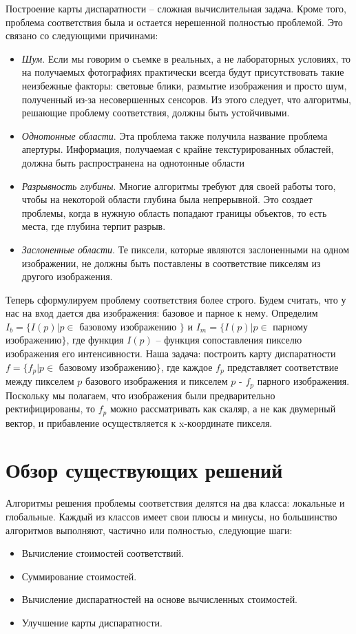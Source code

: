 Построение карты диспаратности – сложная вычислительная задача.
Кроме того, проблема соответствия была и остается нерешенной полностью 
проблемой. Это связано со следующими причинами:
\begin{itemize}
\item \textit{Шум}. Если мы говорим о съемке в реальных, а не лабораторных условиях, 
то на получаемых фотографиях практически всегда будут присутствовать 
такие неизбежные факторы: световые блики, размытие изображения и 
просто шум, полученный из-за несовершенных сенсоров. Из этого 
следует, что алгоритмы, решающие проблему соответствия, должны быть 
устойчивыми.
\item \textit{Однотонные области}. Эта проблема также получила название проблема 
апертуры. Информация, получаемая с крайне текстурированных областей, 
должна быть распространена на однотонные области
\item \textit{Разрывность глубины}. Многие алгоритмы требуют для своей работы того, 
чтобы на некоторой области глубина была непрерывной. Это создает 
проблемы, когда в нужную область попадают границы объектов, то есть 
места, где глубина терпит разрыв.
\item \textit{Заслоненные области}. Те пиксели, которые являются заслоненными на 
одном изображении, не должны быть поставлены в соответствие пикселям
из другого изображения.
\end{itemize}

Теперь сформулируем проблему соответствия более строго. Будем считать, 
что у нас на вход дается два изображения: базовое и парное к нему. 
Определим 
$I_b = \{I(p) | p \in $ базовому изображению $\}$ 
и $I_m = \{I(p) | p \in $ парному изображению$\}$, где функция $I(p)$ – функция сопоставления пикселю изображения его интенсивности. 
Наша задача: построить карту 
диспаратности $f = \{f_p | p \in$ базовому изображению$\}$, где каждое $f_p$
представляет соответствие между пикселем $p$ базового изображения и 
пикселем $p$ - $f_p$ парного изображения. Поскольку мы полагаем, что 
изображения были предварительно ректифицированы, то $f_p$ можно 
рассматривать как скаляр, а не как двумерный вектор, и прибавление 
осуществляется к x-координате пикселя.

\section{Обзор существующих решений}
\label{other_algos}
Алгоритмы решения проблемы соответствия делятся на два класса: локальные и глобальные. Каждый из классов имеет свои плюсы и минусы, но большинство алгоритмов выполняют, частично или полностью, следующие шаги:
\begin{itemize}
\item Вычисление стоимостей соответствий. 
\item Суммирование стоимостей. 
\item Вычисление диспаратностей на основе вычисленных стоимостей. 
\item Улучшение карты диспаратности.
\end{itemize}

